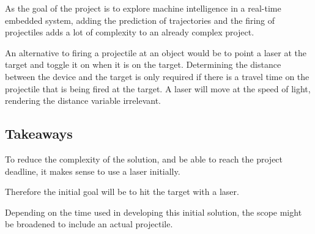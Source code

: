 As the goal of the project is to explore machine intelligence in a real-time embedded system, adding the prediction of trajectories and the firing of projectiles adds a lot of complexity to an already complex project.

An alternative to firing a projectile at an object would be to point a laser at the target and toggle it on when it is on the target.
Determining the distance between the device and the target is only required if there is a travel time on the projectile that is being fired at the target.
A laser will move at the speed of light, rendering the distance variable irrelevant.


\subsection{Takeaways}\label{anal:laser:takeaway}
To reduce the complexity of the solution, and be able to reach the project deadline, it makes sense to use a laser initially. 

Therefore the initial goal will be to hit the target with a laser.

Depending on the time used in developing this initial solution, the scope might be broadened to include an actual projectile.
